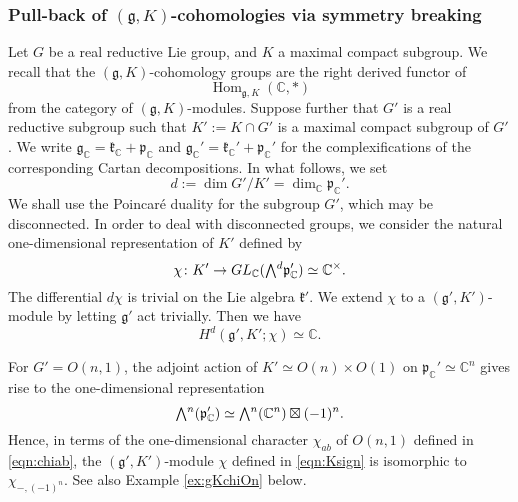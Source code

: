 \subsubsection{Pull-back of $({\mathfrak{g}},K)$-cohomologies
 via symmetry breaking}
Let $G$ be a real reductive Lie group,
 and $K$ a maximal compact subgroup.  
We recall that the $({\mathfrak{g}},K)$-cohomology groups
 are the right derived functor of 
\[
   {\operatorname{Hom}}_{{\mathfrak{g}},K}({\mathbb{C}},\ast)
\]
{}from the category of $({\mathfrak{g}},K)$-modules.  
Suppose further 
 that $G'$ is a real reductive subgroup 
 such that $K':=K \cap G'$ is a maximal compact subgroup
 of $G'$.  
We write 
$
   {\mathfrak{g}}_{\mathbb{C}}
  ={\mathfrak{k}}_{\mathbb{C}}+{\mathfrak{p}}_{\mathbb{C}}
$ and 
$
   {\mathfrak{g}}_{\mathbb{C}}'
  ={\mathfrak{k}}_{\mathbb{C}}'+{\mathfrak{p}}_{\mathbb{C}}'
$
 for the complexifications of the corresponding Cartan decompositions.  
In what follows, 
we set 
\[
  d:=\dim G'/K'=\dim_{\mathbb{C}}{\mathfrak{p}}_{\mathbb{C}}'.  
\]
We shall use the Poincar{\'e} duality
 for the subgroup $G'$, 
 which may be disconnected.  
In order to deal with disconnected groups, 
 we consider the natural one-dimensional representation of $K'$
 defined by 
\begin{equation}
\label{eqn:Ksign}
   \chi \colon K' \to GL_{\mathbb{C}}
   (\Exterior^d {\mathfrak{p}}_{\mathbb{C}}')
   \simeq {\mathbb{C}}^{\times}.  
\end{equation}
The differential $d \chi$ is trivial 
 on the Lie algebra ${\mathfrak{k}}'$.  
We extend $\chi$ to a $({\mathfrak{g}}', K')$-module
 by letting ${\mathfrak{g}}'$ act trivially.  
Then we have 
\begin{equation}
\label{eqn:gKtop}
   H^d({\mathfrak{g}}',K';\chi) \simeq {\mathbb{C}}.  
\end{equation}

\begin{example}
\label{ex:chiOn}
For $G'=O(n,1)$, 
 the adjoint action of $K' \simeq O(n) \times O(1)$
 on ${\mathfrak{p}}_{\mathbb{C}}' \simeq {\mathbb{C}}^n$
 gives rise to the one-dimensional representation
\[
   \Exterior^n ({\mathfrak{p}}_{\mathbb{C}}')
   \simeq
   \Exterior^n ({\mathbb{C}}^n) \boxtimes (-1)^n.  
\]
Hence, 
 in terms of the one-dimensional character
 $\chi_{a b}$ of $O(n,1)$
 defined in \eqref{eqn:chiab}, 
 the $({\mathfrak{g}}', K')$-module $\chi$
 defined in \eqref{eqn:Ksign} is isomorphic to $\chi_{-,(-1)^n}$.  
See also Example \ref{ex:gKchiOn} below.  
\end{example}

